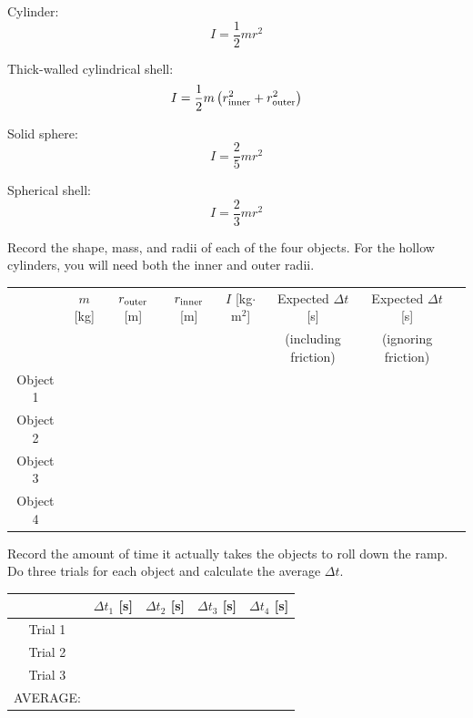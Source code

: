\documentclass[11pt,letterpaper]{article}
\begin{document}
Cylinder:
$$I=\frac{1}{2}mr^2$$

Thick-walled cylindrical shell:
$$I=\frac{1}{2}m\left(r_{\rm inner}^2+r_{\rm outer}^2\right)$$

Solid sphere:
$$I=\frac{2}{5}mr^2$$

Spherical shell:
$$I=\frac{2}{3}mr^2$$

\vspace{1cm}

Record the shape, mass, and radii of each of the four objects. For the hollow cylinders, you will need both the inner and outer radii.

\begin{table}[h!]
\begin{tabular}{|c|c|c|c|c|c|c|c|}
\hline
& $m$ [kg] & $r_{\rm outer}$ [m] & $r_{\rm inner}$ [m] & $I$ [kg$\cdot$m$^2$] & Expected $\Delta{t}$ [s] & Expected $\Delta{t}$ [s]\\
& & & & & (including friction) & (ignoring friction)\\
\hline Object 1 & \hspace{1.5cm} & \hspace{1.5cm} & \hspace{1.5cm} & \hspace{1.5cm} & \hspace{1.5cm} & \hspace{1.5cm} \\
\hline Object 2 & & & & & & \\
\hline Object 3 & & & & & & \\
\hline Object 4 & & & & & & \\
\hline
\end{tabular}
\end{table}

Record the amount of time it actually takes the objects to roll down the ramp. Do three trials for each object and calculate the average $\Delta{t}$.
\begin{table}[h!]
\begin{tabular}{|c|c|c|c|c|}
\hline & $\Delta{t_1}$ [s] & $\Delta{t_2}$  [s] & $\Delta{t_3}$ [s] & $\Delta{t_4}$  [s] \\
\hline Trial 1 & \hspace{3cm} &\hspace{3cm} & \hspace{3cm} & \hspace{3cm} \\
\hline Trial 2 & & & & \\
\hline Trial 3 & & & & \\
\hline\hline AVERAGE: & & & & \\
\hline
\end{tabular}
\end{table}
\end{document}
